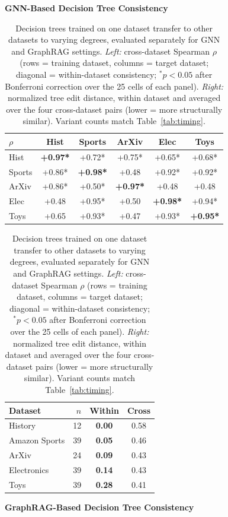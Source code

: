 \begin{table}[htbp]
\centering
\renewcommand{\arraystretch}{1.25}
\small
\setlength{\tabcolsep}{3.7pt}
\caption{Decision trees trained on one dataset transfer to other datasets to varying degrees, evaluated separately for GNN and GraphRAG settings. \textit{Left:} cross-dataset Spearman $\rho$ (rows = training dataset, columns = target dataset; diagonal = within-dataset consistency; $^{*}p<0.05$ after Bonferroni correction over the 25 cells of each panel). \textit{Right:} normalized tree edit distance, within dataset and averaged over the four cross-dataset pairs (lower = more structurally similar). Variant counts match Table~\ref{tab:timing}.}
\label{tab:dt_consistency}

\vspace{0.5em}
\textbf{GNN-Based Decision Tree Consistency}

\begin{tabular}[t]{lccccc}
\toprule
$\rho$ & Hist & Sports & ArXiv & Elec & Toys \\
\midrule
Hist  & \textbf{+0.97*} & +0.72* & +0.75* & +0.65* & +0.68* \\
Sports& +0.86* & \textbf{+0.98*} & +0.48\phantom{*} & +0.92* & +0.92* \\
ArXiv & +0.86* & +0.50* & \textbf{+0.97*} & +0.48\phantom{*} & +0.48\phantom{*} \\
Elec  & +0.48\phantom{*} & +0.95* & +0.50\phantom{*} & \textbf{+0.98*} & +0.94* \\
Toys  & +0.65\phantom{*} & +0.93* & +0.47\phantom{*} & +0.93* & \textbf{+0.95*} \\
\bottomrule
\end{tabular}%
\hspace{2em}
\begin{tabular}[t]{lrcc}
\toprule
Dataset & $n$ & Within & Cross \\
\midrule
History       & 12 & \textbf{0.00} & 0.58 \\
Amazon Sports & 39 & \textbf{0.05} & 0.46 \\
ArXiv         & 24 & \textbf{0.09} & 0.43 \\
Electronics   & 39 & \textbf{0.14} & 0.43 \\
Toys          & 39 & \textbf{0.28} & 0.41 \\
\bottomrule
\end{tabular}

\vspace{1em}
\textbf{GraphRAG-Based Decision Tree Consistency}


\end{table}
